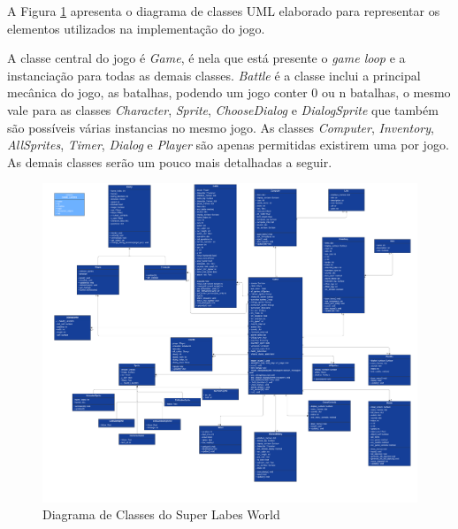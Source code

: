 A Figura \ref{fig:diagrama-de-classes-uml} apresenta o diagrama de classes UML elaborado para representar os elementos utilizados na implementação do jogo. 


A classe central do jogo é \textit{Game}, é nela que está presente o \textit{game loop} e a instanciação para todas as demais classes. \textit{Battle} é a classe inclui a principal mecânica do jogo, as batalhas, podendo um jogo conter 0 ou n batalhas, o mesmo vale para as classes \textit{Character}, \textit{Sprite}, \textit{ChooseDialog} e \textit{DialogSprite} que também são possíveis várias instancias no mesmo jogo. As classes \textit{Computer}, \textit{Inventory}, \textit{AllSprites}, \textit{Timer}, \textit{Dialog} e \textit{Player} são apenas permitidas existirem uma por jogo. As demais classes serão um pouco mais detalhadas a seguir.


\begin{landscape}
\begin{figure}[h!]
    \centering
    \includegraphics[width=0.8\linewidth]{figuras/diagrama-de-classes-uml.png}
    \caption{Diagrama de Classes do Super Labes World}
    \label{fig:diagrama-de-classes-uml}
\end{figure}
\end{landscape}


